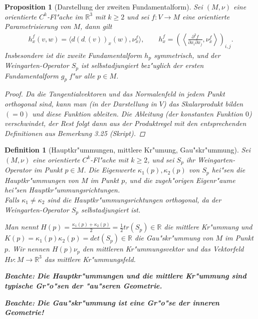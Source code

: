 \documentclass[10pt,a4paper]{article}
\newcommand{\fc}[1]{\special{fc=#1}}
\newtheorem{defi}[sat]{Definition}
\newtheorem{prop}[sat]{Proposition}
\newcommand{\beachte}[1]{\parbox{300\unitlength}{\textbf{Beachte: }\textbf{#1}}}
\begin{document}
\fc{PDarstellungzweiteFF}
\begin{prop}[Darstellung der zweiten Fundamentalform]
 Sei $(M,\nu)$ eine orientierte $C^k$-Fl"ache im $\mathbb{R}^3$ mit $k\geq 2$ und sei
 $f:V\rightarrow M$ eine orientierte Parametrisierung von $M$, dann gilt
 \begin{align*}
  h_x^f(v,w) = \langle d(d_\cdot (v))_x(w), \nu_x^f \rangle, \qquad
  h_x^f = \left( \left\langle \frac{\partial^2 f}{\partial x_i \partial x_j}, \nu_x^f \right\rangle \right)_{i,j}.
 \end{align*}
Insbesondere ist die zweite Fundamentalform $h_p$ symmetrisch, und der Weingarten-Operator $S_p$ ist selbstadjungiert
bez"uglich der ersten Fundamentalform $g_p$ f"ur alle $p\in M$.
\begin{proof}
 Da die Tangentialvektoren und das Normalenfeld in jedem Punkt orthogonal sind, kann man (in der Darstellung in $V$) das Skalarprodukt bilden $(=0)$ und diese
 Funktion ableiten. Die Ableitung (der konstanten Funktion $0$) verschwindet, der Rest folgt dann
 aus der Produktregel mit den entsprechenden Definitionen aus Bemerkung 3.25 (Skript).
\end{proof}
\end{prop}

\fc{DHauptkruemmung}
\begin{defi}[Hauptkr"ummungen, mittlere Kr"umung, Gau"skr"ummung]
 Sei $\left( M, \nu \right)$ eine orientierte $C^k$-Fl"ache mit $k\geq 2$, und 
 sei $S_p$ ihr Weingarten-Operator im Punkt $p\in M$. Die Eigenwerte $\kappa_1(p),\kappa_2(p)$
 von $S_p$ hei"sen die Hauptkr"ummungen von $M$ im Punkt $p$, und die zugeh"origen Eigenr"aume hei"sen Hauptkr"ummungsrichtungen. \\
Falls $\kappa_1\neq\kappa_2$ sind die Hauptkr"ummungsrichtungen orthogonal, da der Weingarten-Operator $S_p$ selbstadjungiert ist.
 
 Man nennt $H(p)=\frac{\kappa_1(p)+\kappa_2(p)}{2}=\frac12 tr(S_p)\in \mathbb{R}$ die mittlere Kr"ummung und 
 $K(p)=\kappa_1(p)\kappa_2(p)=det(S_p)\in \mathbb{R}$ die Gau"skr"ummung von $M$ im Punkt $p$. Wir nennen
 $H(p)\nu_p$ den mittleren Kr"ummungsvektor und das Vektorfeld $H\nu: M\rightarrow \mathbb{R}^3$ das mittlere Kr"ummungsfeld.

\beachte{Die Hauptkr"ummungen und die mittlere Kr"ummung sind typische Gr"o"sen der "au"seren Geometrie.}

\beachte{Die Gau"skr"ummung ist eine Gr"o"se der inneren Geometrie!}


\end{defi}
\end{document}
